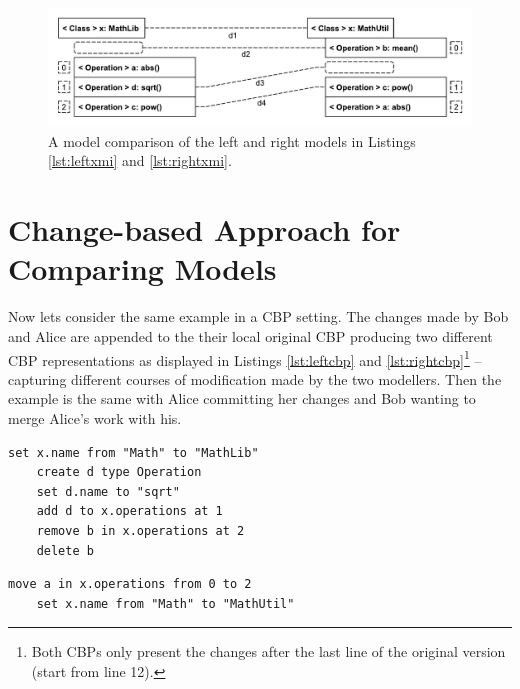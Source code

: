 \begin{figure}
    \includegraphics[width=\linewidth]{XmiComparison}
    \caption{A model comparison of the left and right models in Listings \ref{lst:leftxmi} and \ref{lst:rightxmi}.}
    \label{fig:xmi_comparison}
\end{figure}

\section{Change-based Approach for Comparing Models}
\label{sec:change_based_approach_for_comparing_models}

Now lets consider the same example in a CBP setting.
The changes made by Bob and Alice are appended to the their local original CBP producing two different CBP representations as displayed in Listings \ref{lst:leftcbp} and \ref{lst:rightcbp}\footnote{Both CBPs only present the changes after the last line of the original version (start from line 12).} -- capturing different courses of modification made by the two modellers.
Then the example is the same with Alice committing her changes and Bob wanting to merge Alice's work with his. 


\begin{minipage}[t]{0.49\linewidth}    
    \begin{lstlisting}[firstnumber=12,style=eol,caption={The appended changes made by Bob to produce the model in Fig. \ref{fig:left} (left version).},label=lst:leftcbp]
    set x.name from "Math" to "MathLib"
    create d type Operation
    set d.name to "sqrt"
    add d to x.operations at 1
    remove b in x.operations at 2
    delete b
    \end{lstlisting}
\end{minipage}
\hfill
\begin{minipage}[t]{0.49\linewidth}
    \begin{lstlisting}[firstnumber=12,style=eol,caption={The appended changes made by Alice to produce the model in Fig. \ref{fig:right} (right version).},label=lst:rightcbp]
    move a in x.operations from 0 to 2
    set x.name from "Math" to "MathUtil"
    \end{lstlisting}
\end{minipage}

